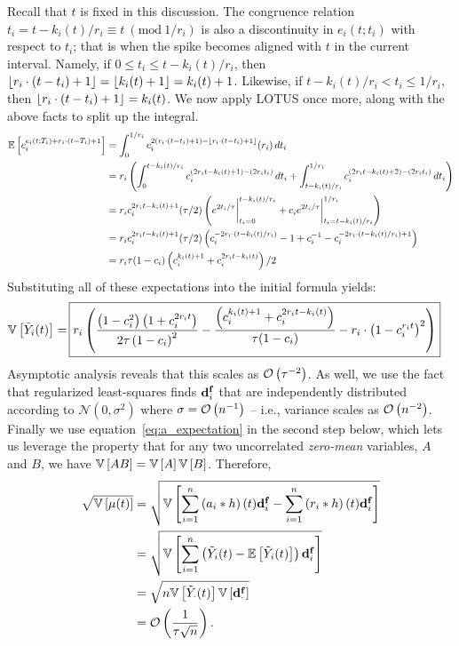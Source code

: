 Recall that $t$ is fixed in this discussion.
The congruence relation \mbox{$t_i = t - k_i(t)/r_i \equiv t \ (\text{mod}\ 1/r_i)$} is also a discontinuity in $e_i(t; t_i)$ with respect to $t_i$; that is when the spike becomes aligned with $t$ in the current interval.
Namely, if $0 \le t_i \le t - k_i(t)/r_i$, then $\lfloor {r_i \cdot (t - t_i) + 1} \rfloor = \lfloor {k_i(t) + 1} \rfloor = k_i(t) + 1$. Likewise, if $t - k_i(t)/r_i < t_i \le 1/r_i$, then $\lfloor {r_i \cdot (t - t_i) + 1} \rfloor = k_i(t)$.
We now apply LOTUS once more, along with the above facts to split up the integral.
\begin{align*}
\mathbb{E}\left[{ c_i^{e_i(t; T_i) + r_i \cdot (t - T_i) + 1} }\right] &= \int_0^{1/r_i} c_i^{2(r_i \cdot (t - t_i) + 1) - \lfloor {r_i \cdot (t - t_i) + 1} \rfloor} (r_i) \, dt_i \\
&= r_i \left( \int_0^{t - k_i(t)/r_i} c_i ^ {(2r_i t - k_i(t) + 1) - (2r_i t_i)} \, dt_i + \int_{t - k_i(t)/r_i}^{1/r_i} c_i^{(2r_i t - k_i(t) + 2) - (2r_i t_i)} \, dt_i \right) \\
&= r_i c_i^{2r_i t - k_i(t) + 1} (\tau / 2) \left( e^{2t_i / \tau} \bigg|_{t_i=0}^{t - k_i(t)/r_i} + c_i e^{2t_i / \tau} \bigg|_{t_i=t - k_i(t)/r_i}^{1/r_i} \right) \\
&= r_i c_i^{2r_i t - k_i(t) + 1} (\tau / 2) \left( c_i^{-2 r_i \cdot (t - k_i(t)/r_i)} - 1 + c_i^{-1} - c_i^{-2r_i \cdot (t - k_i(t)/r_i) + 1} \right) \\
&= r_i \tau (1 - c_i) \left(c_i^{k_i(t) + 1} + c_i^{2r_i t - k_i(t)} \right) / 2
\end{align*}
Substituting all of these expectations into the initial formula yields:
\begin{align*}
\variance{\tilde{Y}_i(t)} = \, \Aboxed{ r_i \left( \frac{\left(1 - c_i^2 \right)\left(1 + c_i^{2r_i t}\right)}{2\tau \left(1 - c_i \right)^2} - \frac{\left( c_i^{k_i(t) + 1} + c_i^{2r_i t - k_i(t)} \right)}{\tau(1 - c_i)} - r_i \cdot \left(1 - c_i^{r_i t} \right)^2 \right) }
\end{align*}
Asymptotic analysis reveals that this scales as $\mathcal{O}\left({\tau^{-2}}\right)$.
As well, we use the fact that regularized least-squares finds
$\mathbf{d}_i^{\mathbf{f}}$ that are independently distributed according to $\mathcal{N}(0, \sigma^2)$ where $\sigma = \mathcal{O}\left({n^{-1}}\right)$ -- i.e., variance scales as $\mathcal{O}\left({n^{-2}}\right)$.
Finally we use equation~\ref{eq:a_expectation} in the second step below, which lets us leverage the property that for any two uncorrelated \emph{zero-mean} variables, $A$ and $B$, we have $\mathbb{V}\left[{AB}\right] = \mathbb{V}\left[{A}\right]\mathbb{V}\left[{B}\right]$.
Therefore,
\begin{equation}
\begin{aligned}
\sqrt{ \mathbb{V}\left[{ \mathbf{\mu}(t) }\right] } &= \sqrt{ \mathbb{V}\left[{\sum_{i=1}^n \left(a_i \ast h \right)(t) \mathbf{d}^{\mathbf{f}}_i- \sum_{i=1}^n \left( r_i \ast h \right)(t) \mathbf{d}^{\mathbf{f}}_i}\right] } \\
&= \sqrt{ \mathbb{V}\left[{\sum_{i=1}^n \left( \tilde{Y}_i(t) - \mathbb{E}\left[{ \tilde{Y}_i(t) }\right] \right) \mathbf{d}^{\mathbf{f}}_i }\right] } \\
&= \sqrt{ n \mathbb{V}\left[{\tilde{Y}_\cdot(t)}\right] \mathbb{V}\left[{\mathbf{d}^{\mathbf{f}}_\cdot}\right]} \\
&= \mathcal{O}\left({ \frac{1}{\tau \sqrt{n}} }\right) \text{.}
\end{aligned}
\end{equation}
